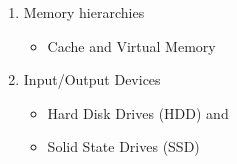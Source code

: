 \begin{frame}[fragile]
\begin{enumerate}
	\item {\small Memory hierarchies}
 \begin{itemize}
     \item {\footnotesize Cache and Virtual Memory }
 \end{itemize}
	\item {\small Input/Output Devices}
 \begin{itemize}
     \item {\footnotesize Hard Disk Drives (HDD) and}
     \item {\footnotesize Solid State Drives (SSD)}
 \end{itemize}
\end{enumerate}


\end{frame}
